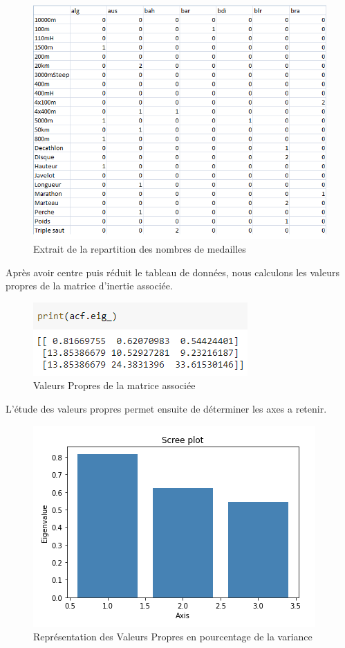 \documentclass{article}
\begin{document}
\begin{figure}[h!]
\centering
\includegraphics[scale=0.75]{images/Extrait.PNG}
\caption{Extrait de la repartition des nombres de medailles}
\end{figure}

Après avoir centre puis réduit le tableau de données, nous calculons les valeurs propres de la matrice d'inertie associée.

\begin{figure}[h!]
\centering
\includegraphics[scale=0.75]{images/VP.PNG}
\caption{Valeurs Propres de la matrice associée}
\end{figure}

\newpage

L'étude des valeurs propres permet ensuite de déterminer les axes a retenir.

\begin{figure}[h!]
\centering
\includegraphics[scale=0.75]{images/Plot_VP.PNG}
\caption{Représentation des Valeurs Propres en pourcentage de la variance}
\end{figure}
\end{document}
